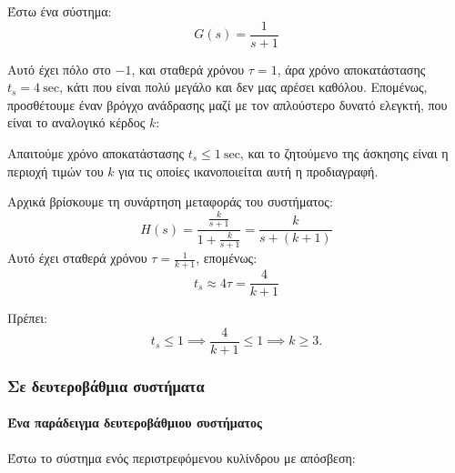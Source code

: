\documentclass[11pt,a4paper,notitlepage,fleqn,final]{article}
\begin{document}
\begin{exercise}
Έστω ένα σύστημα:
\[
G(s) = \frac{1}{s+1}
\]

Αυτό έχει πόλο στο \( -1 \), και σταθερά χρόνου \( τ = 1 \), άρα χρόνο αποκατάστασης \( t_s = 4\ \mathrm{sec} \),
κάτι που είναι πολύ μεγάλο και δεν μας αρέσει καθόλου. Επομένως, προσθέτουμε έναν βρόγχο ανάδρασης μαζί με τον
απλούστερο δυνατό ελεγκτή, που είναι το αναλογικό κέρδος \( \boxed{k} \):


Απαιτούμε χρόνο αποκατάστασης \( t_s \leq 1\ \mathrm{sec} \), και το ζητούμενο της άσκησης είναι η περιοχή τιμών
του \( k \) για τις οποίες ικανοποιείται αυτή η προδιαγραφή.

\tcblower
Αρχικά βρίσκουμε τη συνάρτηση μεταφοράς του συστήματος:
\[
H(s) = \frac{\frac{k}{s+1}}{1+\frac{k}{s+1}}
= \frac{k}{s+(k+1)}
\]
Αυτό έχει σταθερά χρόνου \( τ = \frac{1}{k+1} \), επομένως:
\[
t_s \approx 4τ = \frac{4}{k+1}
\]

Πρέπει:
\[
t_s \leq 1 \implies \frac{4}{k+1} \leq 1 \implies k \geq 3.
\]

\end{exercise}

\subsubsection{Σε δευτεροβάθμια συστήματα}

\paragraph{Ένα παράδειγμα δευτεροβάθμιου συστήματος}
Έστω το σύστημα ενός περιστρεφόμενου κυλίνδρου με απόσβεση:
\end{document}

